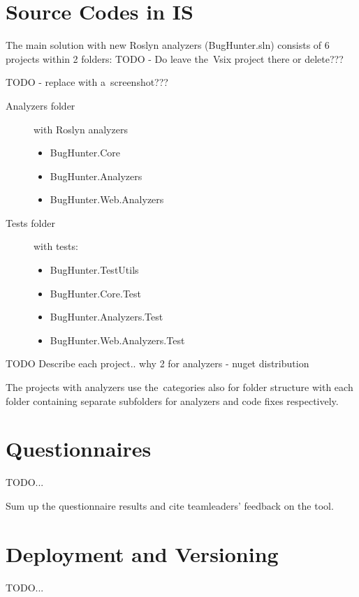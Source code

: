 \documentclass[
  digital, %
  table,   %
  lof,     %
  lot,     %
  oneside,
]{fithesis3}
\begin{document}
\appendix %
\chapter{Source Codes in IS}
\label{appendix:source-codes}
  The main solution with new Roslyn analyzers (BugHunter.sln) consists of 6 projects within 2 folders: TODO - Do leave the~Vsix project there or delete???

TODO - replace with a~screenshot???
\begin{description}
  \item[Analyzers folder] with Roslyn analyzers
  \begin{itemize}
    \item BugHunter.Core
    \item BugHunter.Analyzers
    \item BugHunter.Web.Analyzers
  \end{itemize}
  
  \item[Tests folder] with tests:
  \begin{itemize}
    \item BugHunter.TestUtils
    \item BugHunter.Core.Test
    \item BugHunter.Analyzers.Test
    \item BugHunter.Web.Analyzers.Test
  \end{itemize}
\end{description}

TODO Describe each project.. why 2 for analyzers - nuget distribution

The projects with analyzers use the~categories also for folder structure with each folder containing separate subfolders for analyzers and code fixes respectively.
\chapter{Questionnaires}
TODO...

Sum up the questionnaire results and cite teamleaders' feedback on the tool.

\chapter{Deployment and Versioning}
\label{appendix:deployment}
TODO...
\end{document}
